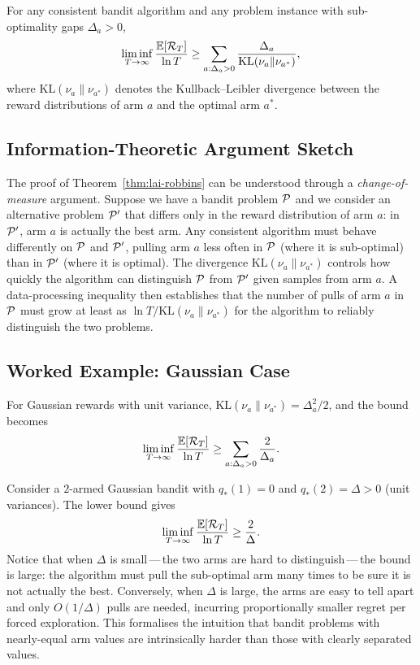 \begin{theorem}
\label{thm:lai-robbins}
For any consistent bandit algorithm and any problem instance with sub-optimality gaps $\Delta_a>0$,
\begin{equation}
\label{eq:lai-robbins}
\liminf_{T\to\infty} \frac{\operatorname{\mathbb{E}}[\mathcal{R}_T]}{\ln T} \ge \sum_{a:\Delta_a>0} \frac{\Delta_a}{\mathrm{KL}(\nu_a\|\nu_{a^*})},
\end{equation}
where $\mathrm{KL}(\nu_a\|\nu_{a^*})$ denotes the Kullback--Leibler divergence between the reward distributions of arm $a$ and the optimal arm $a^*$.
\end{theorem}

\subsection*{Information-Theoretic Argument Sketch}

The proof of Theorem~\ref{thm:lai-robbins} can be understood through a \emph{change-of-measure} argument.  Suppose we have a bandit problem $\mathcal{P}$ and we consider an alternative problem $\mathcal{P}'$ that differs only in the reward distribution of arm $a$: in $\mathcal{P}'$, arm $a$ is actually the best arm.  Any consistent algorithm must behave differently on $\mathcal{P}$ and $\mathcal{P}'$, pulling arm $a$ less often in $\mathcal{P}$ (where it is sub-optimal) than in $\mathcal{P}'$ (where it is optimal).  The divergence $\mathrm{KL}(\nu_a\|\nu_{a^*})$ controls how quickly the algorithm can distinguish $\mathcal{P}$ from $\mathcal{P}'$ given samples from arm $a$.  A data-processing inequality then establishes that the number of pulls of arm $a$ in $\mathcal{P}$ must grow at least as $\ln T / \mathrm{KL}(\nu_a\|\nu_{a^*})$ for the algorithm to reliably distinguish the two problems.

\subsection*{Worked Example: Gaussian Case}

For Gaussian rewards with unit variance, $\mathrm{KL}(\nu_a\|\nu_{a^*})=\Delta_a^2/2$, and the bound becomes
\[
\liminf_{T\to\infty}\frac{\operatorname{\mathbb{E}}[\mathcal{R}_T]}{\ln T}\ge \sum_{a:\Delta_a>0}\frac{2}{\Delta_a}.
\]

\begin{example}
\label{ex:gaussian-lower-bound}
Consider a $2$-armed Gaussian bandit with $q_*(1)=0$ and $q_*(2)=\Delta>0$ (unit variances).  The lower bound gives
\[
\liminf_{T\to\infty}\frac{\operatorname{\mathbb{E}}[\mathcal{R}_T]}{\ln T}\ge \frac{2}{\Delta}.
\]
Notice that when $\Delta$ is small\,---\,the two arms are hard to distinguish\,---\,the bound is large: the algorithm must pull the sub-optimal arm many times to be sure it is not actually the best.  Conversely, when $\Delta$ is large, the arms are easy to tell apart and only $O(1/\Delta)$ pulls are needed, incurring proportionally smaller regret per forced exploration.  This formalises the intuition that bandit problems with nearly-equal arm values are intrinsically harder than those with clearly separated values.
\end{example}


